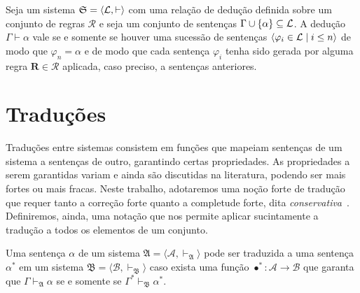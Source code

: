 \vspace{.5\baselineskip}
\begin{tcolorbox}[enhanced jigsaw, breakable, sharp corners, colframe=black, colback=white, boxrule=0.5pt, left=1.5mm, right=1.5mm, top=1.5mm, bottom=1.5mm]
\begin{definition}[Dedução]
    Seja um sistema $\mathfrak{S} = \langle\mathcal{L},{\vdash}\rangle$ com uma relação de dedução definida sobre um conjunto de regras $\mathcal{R}$ e seja um conjunto de sentenças $\Gamma\cup\left\{\alpha\right\}\subseteq\mathcal{L}$.
    A dedução $\Gamma\vdash\alpha$ vale se e somente se houver uma sucessão de sentenças $\langle\varphi_i\in\mathcal{L}\mid i\leq n\rangle$ de modo que $\varphi_n=\alpha$ e de modo que cada sentença $\varphi_i$ tenha sido gerada por alguma regra $\mathbf{R}\in\mathcal{R}$ aplicada, caso preciso, a sentenças anteriores.
\end{definition}
\end{tcolorbox}

\section{Traduções}\label{foundation.translations}

Traduções entre sistemas consistem em funções que mapeiam sentenças de um sistema a sentenças de outro, garantindo certas propriedades.
As propriedades a serem garantidas variam e ainda são discutidas na literatura, podendo ser mais fortes ou mais fracas.
Neste trabalho, adotaremos uma noção forte de tradução que requer tanto a correção forte quanto a completude forte, dita \emph{conservativa}~\citep{Coniglio.2005}.
Definiremos, ainda, uma notação que nos permite aplicar sucintamente a tradução a todos os elementos de um conjunto.

\vspace{.5\baselineskip}
\begin{tcolorbox}[enhanced jigsaw, breakable, sharp corners, colframe=black, colback=white, boxrule=0.5pt, left=1.5mm, right=1.5mm, top=1.5mm, bottom=1.5mm]
\begin{definition}[Tradução] 
    Uma sentença $\alpha$ de um sistema $\mathfrak{A} = \langle\mathcal{A}, \vdash_\mathfrak{A}\rangle$ pode ser traduzida a uma sentença $\alpha^*$ em um sistema $\mathfrak{B} = \langle\mathcal{B}, \vdash_\mathfrak{B} \rangle$ caso exista uma função $\bullet^* : \mathcal{A} \to \mathcal{B}$ que garanta que $\Gamma\vdash_\mathfrak{A}\alpha$ se e somente se $\Gamma^*\vdash_\mathfrak{B}\alpha^*$.
\end{definition}
\end{tcolorbox}

